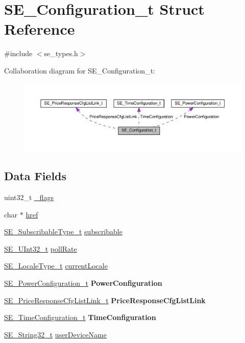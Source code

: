 \hypertarget{structSE__Configuration__t}{}\section{S\+E\+\_\+\+Configuration\+\_\+t Struct Reference}
\label{structSE__Configuration__t}


{\ttfamily \#include $<$se\+\_\+types.\+h$>$}



Collaboration diagram for S\+E\+\_\+\+Configuration\+\_\+t\+:\nopagebreak
\begin{figure}[H]
\begin{center}
\leavevmode
\includegraphics[width=350pt]{structSE__Configuration__t__coll__graph}
\end{center}
\end{figure}
\subsection*{Data Fields}
\begin{DoxyCompactItemize}
\item 
uint32\+\_\+t \hyperlink{group__Configuration_ga8a3ca98bd859b81b66d18b1e187c88d9}{\+\_\+flags}
\item 
char $\ast$ \hyperlink{group__Configuration_ga4e903b7cfa2e74aa671801bcb604387b}{href}
\item 
\hyperlink{group__SubscribableType_ga5c41f553d369710ed34619266bf2551e}{S\+E\+\_\+\+Subscribable\+Type\+\_\+t} \hyperlink{group__Configuration_ga314f37faa263874665349279e360400d}{subscribable}
\item 
\hyperlink{group__UInt32_ga70bd4ecda3c0c85d20779d685a270cdb}{S\+E\+\_\+\+U\+Int32\+\_\+t} \hyperlink{group__Configuration_gab33fe4f10250aa426acb5e134ab4cc0c}{poll\+Rate}
\item 
\hyperlink{group__LocaleType_gafbd2b639ff2cebd36ad75759203ee20c}{S\+E\+\_\+\+Locale\+Type\+\_\+t} \hyperlink{group__Configuration_gae45efe46ca71698cd46e1517aa7e8bae}{current\+Locale}
\item 
\hyperlink{structSE__PowerConfiguration__t}{S\+E\+\_\+\+Power\+Configuration\+\_\+t} {\bfseries Power\+Configuration}
\item 
\hyperlink{structSE__PriceResponseCfgListLink__t}{S\+E\+\_\+\+Price\+Response\+Cfg\+List\+Link\+\_\+t} {\bfseries Price\+Response\+Cfg\+List\+Link}
\item 
\hyperlink{structSE__TimeConfiguration__t}{S\+E\+\_\+\+Time\+Configuration\+\_\+t} {\bfseries Time\+Configuration}
\item 
\hyperlink{group__String32_gac9f59b06b168b4d2e0d45ed41699af42}{S\+E\+\_\+\+String32\+\_\+t} \hyperlink{group__Configuration_gae6dff21a0f541f054b5b0c53ea90b621}{user\+Device\+Name}
\end{DoxyCompactItemize}


